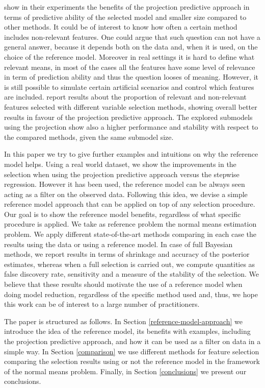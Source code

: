 \documentclass[american,]{article}
\theoremstyle{definition}
\begin{document}
\cite{paper:projpred} show in their experiments the benefits of the projection predictive approach in terms of predictive ability of the selected model and smaller size compared to other methods. It could be of interest to know how often a certain method includes non-relevant features. One could argue that such question can not have a general answer, because it depends both on the data and, when it is used, on the choice of the reference model. Moreover in real settings it is hard to define what relevant means, in most of the cases all the features have some level of relevance in term of prediction ability and thus the question looses of meaning.  However, it is still possible to simulate certain artificial scenarios and control which features are included. \cite{paper:model_selection} report results about the proportion of relevant and non-relevant features selected with different variable selection methods, showing overall better results in favour of the projection predictive approach. The explored submodels using the projection show also a higher performance and stability with respect to the compared methods, given the same submodel size.

In this paper we try to give further examples and intuitions on why the reference model helps. Using a real world dataset, we show the improvements in the selection when using the projection predictive approach versus the stepwise regression. However it has been used, the reference model can be always seen acting as a filter on the observed data. Following this idea, we devise a simple reference model approach that can be applied on top of any selection procedure. Our goal is to show the reference model benefits, regardless of what specific procedure is applied. We take as reference problem the normal means estimation problem. We apply different state-of-the-art methods comparing in each case the results using the data or using a reference model. In case of full Bayesian methods, we report results in terms of shrinkage and accuracy of the posterior estimates, whereas when a full selection is carried out, we compute quantities as false discovery rate, sensitivity and a measure of the stability of the selection. We believe that these results should motivate the use of a reference model when doing model reduction, regardless of the specific method used and, thus, we hope this work can be of interest to a large number of practitioners.

The paper is structured as follows. In Section \ref{reference-model-approach} we introduce the idea of the reference model, its benefits with examples, including the projection predictive approach, and how it can be used as a filter on data in a simple way. In Section \ref{comparison} we use different methods for feature selection comparing the selection results using or not the reference model in the framework of the normal means problem. Finally, in Section \ref{conclusions} we present our conclusions.
\end{document}
